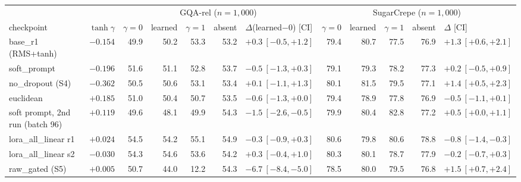 \begin{tabular}{@{}lr rrrrl rrrrl@{}}
\toprule
 & & \multicolumn{5}{c}{GQA-rel ($n{=}1{,}000$)} & \multicolumn{5}{c}{SugarCrepe ($n{=}1{,}000$)} \\
\cmidrule(lr){3-7}\cmidrule(lr){8-12}
checkpoint & $\tanh\gamma$ & $\gamma{=}0$ & learned & $\gamma{=}1$ & absent & $\Delta$(learned$-$0) [CI] & $\gamma{=}0$ & learned & $\gamma{=}1$ & absent & $\Delta$ [CI] \\
\midrule
base\_r1 (RMS+tanh) & $-0.154$ & 49.9 & 50.2 & 53.3 & 53.2 & $+0.3\ [-0.5, +1.2]$ & 79.4 & 80.7 & 77.5 & 76.9 & $+1.3\ [+0.6, +2.1]$ \\
soft\_prompt & $-0.196$ & 51.6 & 51.1 & 52.8 & 53.7 & $-0.5\ [-1.3, +0.3]$ & 79.1 & 79.3 & 78.2 & 77.3 & $+0.2\ [-0.5, +0.9]$ \\
no\_dropout (S4) & $-0.362$ & 50.5 & 50.6 & 53.1 & 53.4 & $+0.1\ [-1.1, +1.3]$ & 80.1 & 81.5 & 79.5 & 77.1 & $+1.4\ [+0.5, +2.3]$ \\
euclidean & $+0.185$ & 51.0 & 50.4 & 50.7 & 53.5 & $-0.6\ [-1.3, +0.0]$ & 79.4 & 78.9 & 77.8 & 76.9 & $-0.5\ [-1.1, +0.1]$ \\
soft prompt, 2nd run (batch 96) & $+0.119$ & 49.6 & 48.1 & 49.9 & 54.3 & $-1.5\ [-2.6, -0.5]$ & 79.9 & 80.4 & 82.8 & 77.2 & $+0.5\ [+0.0, +1.1]$ \\
lora\_all\_linear r1 & $+0.024$ & 54.5 & 54.2 & 55.1 & 54.9 & $-0.3\ [-0.9, +0.3]$ & 80.6 & 79.8 & 80.6 & 78.8 & $-0.8\ [-1.4, -0.3]$ \\
lora\_all\_linear s2 & $-0.030$ & 54.3 & 54.6 & 53.6 & 54.2 & $+0.3\ [-0.4, +1.0]$ & 80.3 & 80.1 & 78.7 & 77.9 & $-0.2\ [-0.7, +0.3]$ \\
raw\_gated (S5) & $+0.005$ & 50.7 & 44.0 & 12.2 & 54.3 & $-6.7\ [-8.4, -5.0]$ & 78.5 & 80.0 & 79.5 & 76.8 & $+1.5\ [+0.7, +2.4]$ \\
\bottomrule
\end{tabular}
